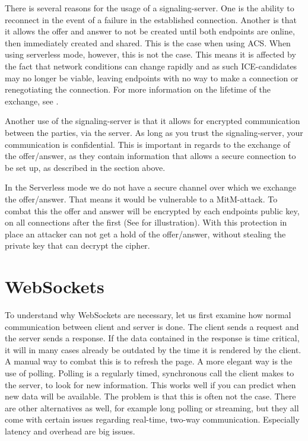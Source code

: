     There is several reasons for the usage of a signaling-server. One is the ability to reconnect in the event of a failure in the established connection. Another is that it allows the offer and answer to not be created until both endpoints are online, then immediately created and shared. This is the case when using ACS. When using serverless mode, however, this is not the case. This means it is affected by the fact that network conditions can change rapidly and as such ICE-candidates may no longer be viable, leaving endpoints with no way to make a connection or renegotiating the connection. For more information on the lifetime of the exchange, see .

    Another use of the signaling-server is that it allows for encrypted communication between the parties, via the server. As long as you trust the signaling-server, your communication is confidential. This is important in regards to the exchange of the offer/answer, as they contain information that allows a secure connection to be set up, as described in the section above.

    In the Serverless mode we do not have a secure channel over which we exchange the offer/answer. That means it would be vulnerable to a MitM-attack. To combat this the offer and answer will be encrypted by each endpoints public key, on all connections after the first (See  for illustration). With this protection in place an attacker can not get a hold of the offer/answer, without stealing the private key that can decrypt the cipher.

%
\section{WebSockets}
\label{sec:ws}
%
To understand why WebSockets are necessary, let us first examine how normal communication between client and server is done. The client sends a request and the server sends a response. If the data contained in the response is time critical, it will in many cases already be outdated by the time it is rendered by the client. A manual way to combat this is to refresh the page. A more elegant way is the use of polling. Polling is a regularly timed, synchronous call the client makes to the server, to look for new information. This works well if you can predict when new data will be available. The problem is that this is often not the case. There are other alternatives as well, for example long polling or streaming, but they all come with certain issues regarding real-time, two-way communication. Especially latency and overhead are big issues.

